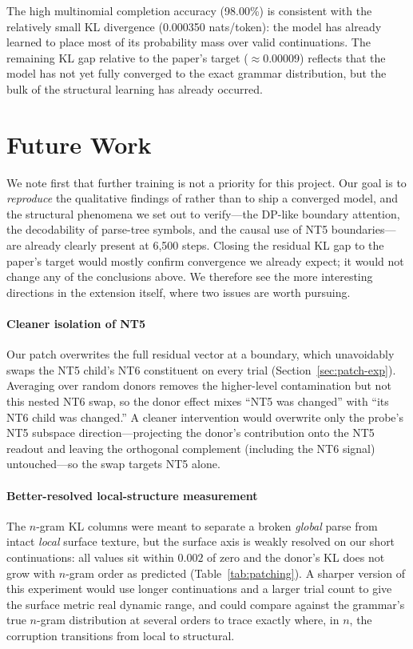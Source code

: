 \documentclass[10pt,twocolumn]{article}
\begin{document}
The high multinomial completion accuracy (98.00\%) is consistent with the relatively small KL divergence (0.000350 nats/token): the model has already learned to place most of its probability mass over valid continuations. The remaining KL gap relative to the paper's target (${\approx}0.00009$) reflects that the model has not yet fully converged to the exact grammar distribution, but the bulk of the structural learning has already occurred.

\section{Future Work}
\label{sec:future-work}

We note first that further training is not a priority for this project. Our goal is to \emph{reproduce} the qualitative findings of \citet{allen-zhu2023physics} rather than to ship a converged model, and the structural phenomena we set out to verify---the DP-like boundary attention, the decodability of parse-tree symbols, and the causal use of NT5 boundaries---are already clearly present at 6{,}500 steps. Closing the residual KL gap to the paper's target would mostly confirm convergence we already expect; it would not change any of the conclusions above. We therefore see the more interesting directions in the extension itself, where two issues are worth pursuing.

\paragraph{Cleaner isolation of NT5} Our patch overwrites the full residual vector at a boundary, which unavoidably swaps the NT5 child's NT6 constituent on every trial (Section~\ref{sec:patch-exp}). Averaging over random donors removes the higher-level contamination but not this nested NT6 swap, so the donor effect mixes ``NT5 was changed'' with ``its NT6 child was changed.'' A cleaner intervention would overwrite only the probe's NT5 subspace direction---projecting the donor's contribution onto the NT5 readout and leaving the orthogonal complement (including the NT6 signal) untouched---so the swap targets NT5 alone.

\paragraph{Better-resolved local-structure measurement} The $n$-gram KL columns were meant to separate a broken \emph{global} parse from intact \emph{local} surface texture, but the surface axis is weakly resolved on our short continuations: all values sit within $0.002$ of zero and the donor's KL does not grow with $n$-gram order as predicted (Table~\ref{tab:patching}). A sharper version of this experiment would use longer continuations and a larger trial count to give the surface metric real dynamic range, and could compare against the grammar's true $n$-gram distribution at several orders to trace exactly where, in $n$, the corruption transitions from local to structural.
\end{document}
